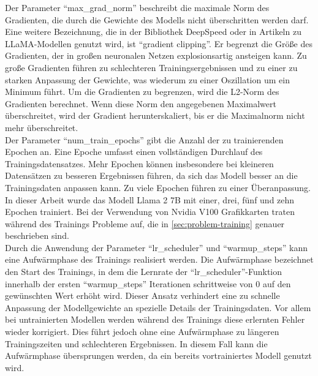 Der Parameter \enquote{max\_grad\_norm} beschreibt die maximale Norm des Gradienten, die durch die Gewichte des Modells nicht überschritten werden darf. 
Eine weitere Bezeichnung, die in der Bibliothek DeepSpeed oder in Artikeln zu LLaMA-Modellen genutzt wird, ist \enquote{gradient clipping}.
Er begrenzt die Größe des Gradienten, der in großen neuronalen Netzen explosionsartig ansteigen kann.
Zu große Gradienten führen zu schlechteren Trainingsergebnissen und zu einer zu starken Anpassung der Gewichte, was wiederum zu einer Oszillation um ein Minimum führt.
Um die Gradienten zu begrenzen, wird die L2-Norm des Gradienten berechnet.
Wenn diese Norm den angegebenen Maximalwert überschreitet, wird der Gradient herunterskaliert, bis er die Maximalnorm nicht mehr überschreitet.\\

Der Parameter \enquote{num\_train\_epochs} gibt die Anzahl der zu trainierenden Epochen an.
Eine Epoche umfasst einen vollständigen Durchlauf des Trainingsdatensatzes.
Mehr Epochen können insbesondere bei kleineren Datensätzen zu besseren Ergebnissen führen, da sich das Modell besser an die Trainingsdaten anpassen kann.
Zu viele Epochen führen zu einer Überanpassung.
In dieser Arbeit wurde das Modell Llama 2 7B mit einer, drei, fünf und zehn Epochen trainiert.
Bei der Verwendung von Nvidia V100 Grafikkarten traten während des Trainings Probleme auf, die in \cref{sec:problem-training} genauer beschrieben sind.\\

Durch die Anwendung der Parameter \enquote{lr\_scheduler} und \enquote{warmup\_steps} kann eine Aufwärmphase des Trainings realisiert werden.
Die Aufwärmphase bezeichnet den Start des Trainings, in dem die Lernrate der \enquote{lr\_scheduler}-Funktion innerhalb der ersten \enquote{warmup\_steps} Iterationen schrittweise von 0 auf den gewünschten Wert erhöht wird.
Dieser Ansatz verhindert eine zu schnelle Anpassung der Modellgewichte an spezielle Details der Trainingsdaten.
Vor allem bei untrainierten Modellen werden während des Trainings diese erlernten Fehler wieder korrigiert. Dies führt jedoch ohne eine Aufwärmphase zu längeren Trainingszeiten und schlechteren Ergebnissen.
In diesem Fall kann die Aufwärmphase übersprungen werden, da ein bereits vortrainiertes Modell genutzt wird.\\


